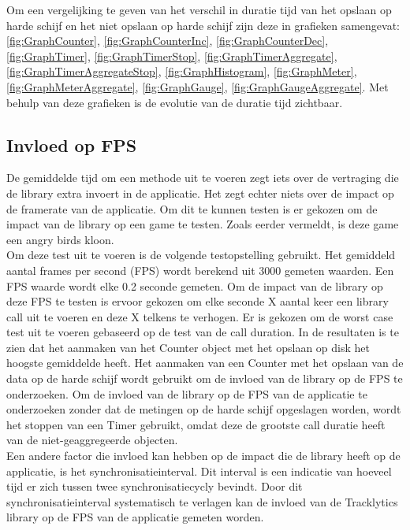 Om een vergelijking te geven van het verschil in duratie tijd van het opslaan op harde schijf en het niet opslaan op harde schijf zijn deze in grafieken samengevat: \ref{fig:GraphCounter}, \ref{fig:GraphCounterInc}, \ref{fig:GraphCounterDec}, \ref{fig:GraphTimer}, \ref{fig:GraphTimerStop}, \ref{fig:GraphTimerAggregate}, \ref{fig:GraphTimerAggregateStop}, \ref{fig:GraphHistogram}, \ref{fig:GraphMeter}, \ref{fig:GraphMeterAggregate}, \ref{fig:GraphGauge}, \ref{fig:GraphGaugeAggregate}. Met behulp van deze grafieken is de evolutie van de duratie tijd zichtbaar. 

\subsection{Invloed op FPS}
De gemiddelde tijd om een methode uit te voeren zegt iets over de vertraging die de library extra invoert in de applicatie. Het zegt echter niets over de impact op de framerate van de applicatie. Om dit te kunnen testen is er gekozen om de impact van de library op een game te testen. Zoals eerder vermeldt, is deze game een angry birds kloon. \\

Om deze test uit te voeren is de volgende testopstelling gebruikt. Het gemiddeld aantal frames per second (FPS) wordt berekend uit 3000 gemeten waarden. Een FPS waarde wordt elke 0.2 seconde gemeten. Om de impact van de library op deze FPS te testen is ervoor gekozen om elke seconde X aantal keer een library call uit te voeren en deze X telkens te verhogen. Er is gekozen om de worst case test uit te voeren gebaseerd op de test van de call duration. In de resultaten is te zien dat het aanmaken van het Counter object met het opslaan op disk het hoogste gemiddelde heeft. Het aanmaken van een Counter met het opslaan van de data op de harde schijf wordt gebruikt om de invloed van de library op de FPS te onderzoeken. Om de invloed van de library op de FPS van de applicatie te onderzoeken zonder dat de metingen op de harde schijf opgeslagen worden, wordt het stoppen van een Timer gebruikt, omdat deze de grootste call duratie heeft van de niet-geaggregeerde objecten. \\

Een andere factor die invloed kan hebben op de impact die de library heeft op de applicatie, is het synchronisatieinterval. Dit interval is een indicatie van hoeveel tijd er zich tussen twee synchronisatiecycly bevindt. Door dit synchronisatieinterval systematisch te verlagen kan de invloed van de Tracklytics library op de FPS van de applicatie gemeten worden. \\

